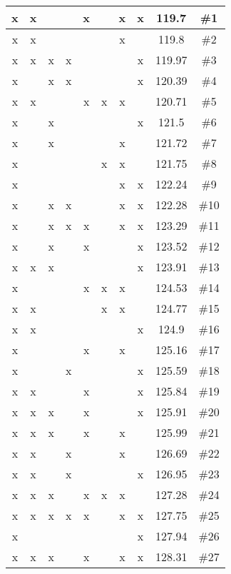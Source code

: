 \begin{center}
\begin{longtable}{|c|c|c|c|c|c|c|c|c|c|}
 x &  x &  &  &  x &  &  x &  x & 119.7 & \#1 \\ \hline
 x &  x &  &  &  &  &  x &  & 119.8 & \#2 \\ \hline
 x &  x &  x &  x &  &  &  &  x & 119.97 & \#3 \\ \hline
 x &  &  x &  x &  &  &  &  x & 120.39 & \#4 \\ \hline
 x &  x &  &  &  x &  x &  x &  & 120.71 & \#5 \\ \hline
 x &  &  x &  &  &  &  &  x & 121.5 & \#6 \\ \hline
 x &  &  x &  &  &  &  x &  & 121.72 & \#7 \\ \hline
 x &  &  &  &  &  x &  x &  & 121.75 & \#8 \\ \hline
 x &  &  &  &  &  &  x &  x & 122.24 & \#9 \\ \hline
 x &  &  x &  x &  &  &  x &  x & 122.28 & \#10 \\ \hline
 x &  &  x &  x &  x &  &  x &  x & 123.29 & \#11 \\ \hline
 x &  &  x &  &  x &  &  &  x & 123.52 & \#12 \\ \hline
 x &  x &  x &  &  &  &  &  x & 123.91 & \#13 \\ \hline
 x &  &  &  &  x &  x &  x &  & 124.53 & \#14 \\ \hline
 x &  x &  &  &  &  x &  x &  & 124.77 & \#15 \\ \hline
 x &  x &  &  &  &  &  &  x & 124.9 & \#16 \\ \hline
 x &  &  &  &  x &  &  x &  & 125.16 & \#17 \\ \hline
 x &  &  &  x &  &  &  &  x & 125.59 & \#18 \\ \hline
 x &  x &  &  &  x &  &  &  x & 125.84 & \#19 \\ \hline
 x &  x &  x &  &  x &  &  &  x & 125.91 & \#20 \\ \hline
 x &  x &  x &  &  x &  &  x &  & 125.99 & \#21 \\ \hline
 x &  x &  &  x &  &  &  x &  & 126.69 & \#22 \\ \hline
 x &  x &  &  x &  &  &  &  x & 126.95 & \#23 \\ \hline
 x &  x &  x &  &  x &  x &  x &  & 127.28 & \#24 \\ \hline
 x &  x &  x &  x &  x &  &  x &  x & 127.75 & \#25 \\ \hline
 x &  &  &  &  &  &  &  x & 127.94 & \#26 \\ \hline
 x &  x &  x &  &  x &  &  x &  x & 128.31 & \#27 \\ \hline

\end{longtable}
\end{center}
